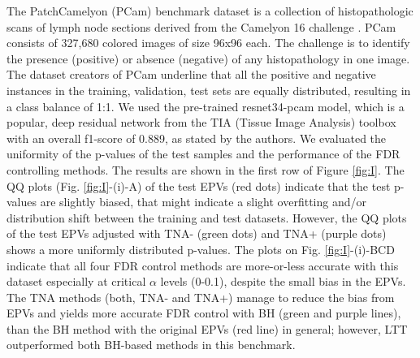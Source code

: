 \documentclass{article}
\begin{document}
The PatchCamelyon (PCam) benchmark dataset is a collection of histopathologic scans of lymph node sections \cite{Veeling2018-qh} derived from the Camelyon 16 challenge \cite{camelyon16}. PCam consists of 327,680 colored images of size 96x96 each. The challenge is to identify the presence (positive) or absence (negative) of any histopathology in one image. The dataset creators of PCam underline that all the positive and negative instances in the training, validation, test sets are equally distributed, resulting in a class balance of 1:1. We used the pre-trained resnet34-pcam model, which is a popular, deep residual network from the TIA (Tissue Image Analysis) toolbox \cite{Pocock2022} with an overall f1-score of 0.889, as stated by the authors. We evaluated the uniformity of the p-values of the test samples and the performance of the FDR controlling methods. The results are shown in the first row of Figure \ref{fig:I}.  The QQ plots (Fig. \ref{fig:I}-(i)-A) of the test EPVs (red dots) indicate that the test p-values are slightly biased, that might indicate a slight overfitting and/or distribution shift between the training and test datasets. However, the QQ plots of the test  EPVs adjusted with TNA- (green dots) and TNA+ (purple dots) shows a more uniformly distributed p-values. The plots on Fig. \ref{fig:I}-(i)-BCD indicate that all four FDR control methods are more-or-less accurate with this dataset especially at critical $\alpha$ levels (0-0.1), despite the small bias in the EPVs. The TNA methods (both, TNA- and TNA+) manage to reduce the bias from EPVs and yields more accurate FDR control with BH (green and purple lines), than the BH method with the original EPVs (red line) in general; however, LTT outperformed both BH-based methods in this benchmark. 
\end{document}

